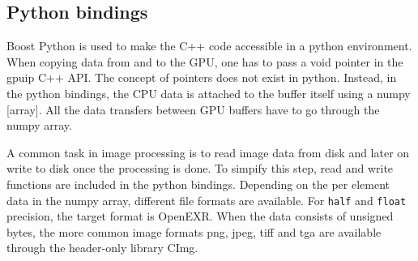 \subsection{Python bindings}

Boost Python\cite{boostpython} is used to make the C++ code accessible in a python environment. When copying data from and to the GPU, one has to pass a void pointer in the gpuip C++ API. The concept of pointers does not exist in python. Instead, in the python bindings, the CPU data is attached to the buffer itself using a numpy [array]. All the data transfers between GPU buffers have to go through the numpy array.
\newline

A common task in image processing is to read image data from disk and later on write to disk once the processing is done. To simpify this step, read and write functions are included in the python bindings. Depending on the per element data in the numpy array, different file formats are available. For {\tt half} and {\tt float} precision, the target format is OpenEXR\cite{openexr}. When the data consists of unsigned bytes, the more common image formats png, jpeg, tiff and tga are available through the header-only library CImg\cite{cimg}.  
